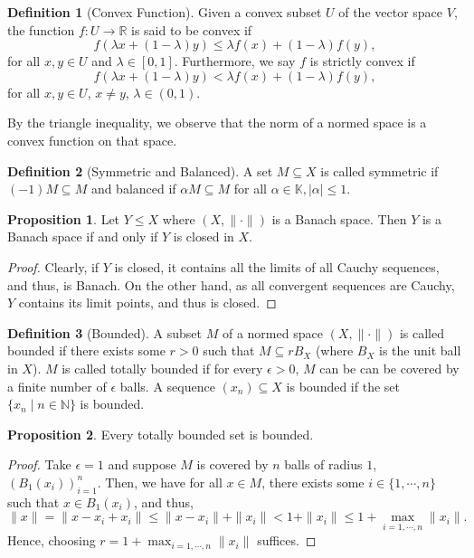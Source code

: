 \documentclass[
]{article}
\theoremstyle{definition}
\theoremstyle{definition}
\newtheorem{definition}{Definition}[section]
\newtheorem{proposition}{Proposition}[section]
\begin{document}
\begin{definition}[Convex Function]
  Given a convex subset \(U\) of the vector space \(V\), the function 
  \(f : U \to \mathbb{R}\) is said to be convex if 
  \[f(\lambda x + (1 - \lambda) y) \le \lambda f(x) + (1 - \lambda) f(y),\]
  for all \(x, y \in U\) and \(\lambda \in [0, 1]\). Furthermore, we say 
  \(f\) is strictly convex if 
  \[f(\lambda x + (1 - \lambda) y) < \lambda f(x) + (1 - \lambda) f(y),\]
  for all \(x, y \in U\), \(x \neq y\), \(\lambda \in (0, 1)\).
\end{definition}

By the triangle inequality, we observe that the norm of a normed space is 
a convex function on that space. 

\begin{definition}[Symmetric and Balanced]
  A set \(M \subseteq X\) is called symmetric if \((-1) M \subseteq M\) and 
  balanced if \(\alpha M \subseteq M\) for all \(\alpha \in \mathbb{K}, 
  |\alpha| \le 1\).
\end{definition}

\begin{proposition}
  Let \(Y \le X\) where \((X, \|\cdot\|)\) is a Banach space. Then \(Y\) is 
  a Banach space if and only if \(Y\) is closed in \(X\). 
\end{proposition}
\begin{proof}
  Clearly, if \(Y\) is closed, it contains all the limits of all Cauchy 
  sequences, and thus, is Banach. On the other hand, as all convergent sequences 
  are Cauchy, \(Y\) contains its limit points, and thus is closed.
\end{proof}

\begin{definition}[Bounded]
  A subset \(M\) of a normed space \((X, \|\cdot\|)\) is called bounded if 
  there exists some \(r > 0\) such that \(M \subseteq rB_X\) (where \(B_X\) is 
  the unit ball in \(X\)). \(M\) is called totally bounded if for every 
  \(\epsilon > 0\), \(M\) can be can be covered by a finite number of 
  \(\epsilon\) balls. A sequence \((x_n) \subseteq X\) is bounded if the 
  set \(\{x_n \mid n \in \mathbb{N}\}\) is bounded.
\end{definition}

\begin{proposition}
  Every totally bounded set is bounded.
\end{proposition}
\begin{proof}
  Take \(\epsilon = 1\) and suppose \(M\) is covered by \(n\) balls of radius 
  \(1\), \((B_1(x_i))_{i = 1}^n\). Then, we have for all \(x \in M\), 
  there exists some \(i \in \{1, \cdots, n\}\) such that \(x \in B_1(x_i)\), 
  and thus,
  \[\|x\| = \|x - x_i + x_i\| \le \|x - x_i\| + \|x_i\| < 1 + \|x_i\| \le 
    1 + \max_{i = 1, \cdots, n} \|x_i\|.\]
  Hence, choosing \(r = 1 + \max_{i = 1, \cdots, n} \|x_i\|\) suffices.
\end{proof}
\end{document}
